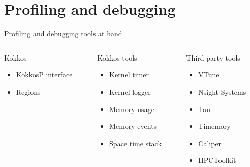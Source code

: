 \documentclass[
    aspectratio=169,
    handout,
]{beamer}
\begin{document}

\section{Profiling and debugging}


\begin{frame}{Profiling and debugging tools at hand}
    \begin{columns}[T]
        \begin{column}{0.33\linewidth}
            Kokkos

            \begin{itemize}
                \item KokkosP interface
                \item Regions
            \end{itemize}
        \end{column}
        \begin{column}{0.33\linewidth}
            Kokkos tools

            \begin{itemize}
                \item Kernel timer
                \item Kernel logger
                \item Memory usage
                \item Memory events
                \item Space time stack
            \end{itemize}
        \end{column}
        \begin{column}{0.33\linewidth}
            Third-party tools

            \begin{itemize}
                \item VTune
                \item Nsight Systems
                \item Tau
                \item Timemory
                \item Caliper
                \item HPCToolkit
            \end{itemize}
        \end{column}
    \end{columns}
\end{frame}
\end{document}
